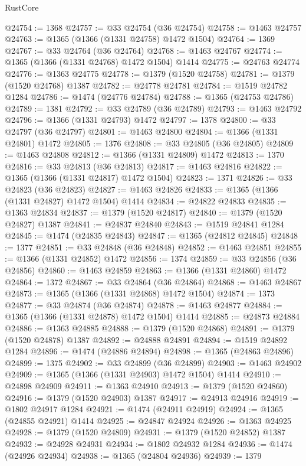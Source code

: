 \begin{lexlean}{RustCore}
\begin{coremodule}
@24754 := 1368
@24757 := @33 @24754 (@36 @24754)
@24758 := @1463 @24757
@24763 := @1365 (@1366 (@1331 @24758) @1472 @1504)
@24764 := 1369
@24767 := @33 @24764 (@36 @24764)
@24768 := @1463 @24767
@24774 := @1365 (@1366 (@1331 @24768) @1472 @1504) @1414
@24775 := @24763 @24774
@24776 := @1363 @24775
@24778 := @1379 (@1520 @24758)
@24781 := @1379 (@1520 @24768) @1387
@24782 := @24778 @24781
@24784 := @1519 @24782 @1284
@24786 := @1474 (@24776 @24784)
@24788 := @1365 (@24753 @24786)
@24789 := 1381
@24792 := @33 @24789 (@36 @24789)
@24793 := @1463 @24792
@24796 := @1366 (@1331 @24793) @1472
@24797 := 1378
@24800 := @33 @24797 (@36 @24797)
@24801 := @1463 @24800
@24804 := @1366 (@1331 @24801) @1472
@24805 := 1376
@24808 := @33 @24805 (@36 @24805)
@24809 := @1463 @24808
@24812 := @1366 (@1331 @24809) @1472
@24813 := 1370
@24816 := @33 @24813 (@36 @24813)
@24817 := @1463 @24816
@24822 := @1365 (@1366 (@1331 @24817) @1472 @1504)
@24823 := 1371
@24826 := @33 @24823 (@36 @24823)
@24827 := @1463 @24826
@24833 := @1365 (@1366 (@1331 @24827) @1472 @1504) @1414
@24834 := @24822 @24833
@24835 := @1363 @24834
@24837 := @1379 (@1520 @24817)
@24840 := @1379 (@1520 @24827) @1387
@24841 := @24837 @24840
@24843 := @1519 @24841 @1284
@24845 := @1474 (@24835 @24843)
@24847 := @1365 (@24812 @24845)
@24848 := 1377
@24851 := @33 @24848 (@36 @24848)
@24852 := @1463 @24851
@24855 := @1366 (@1331 @24852) @1472
@24856 := 1374
@24859 := @33 @24856 (@36 @24856)
@24860 := @1463 @24859
@24863 := @1366 (@1331 @24860) @1472
@24864 := 1372
@24867 := @33 @24864 (@36 @24864)
@24868 := @1463 @24867
@24873 := @1365 (@1366 (@1331 @24868) @1472 @1504)
@24874 := 1373
@24877 := @33 @24874 (@36 @24874)
@24878 := @1463 @24877
@24884 := @1365 (@1366 (@1331 @24878) @1472 @1504) @1414
@24885 := @24873 @24884
@24886 := @1363 @24885
@24888 := @1379 (@1520 @24868)
@24891 := @1379 (@1520 @24878) @1387
@24892 := @24888 @24891
@24894 := @1519 @24892 @1284
@24896 := @1474 (@24886 @24894)
@24898 := @1365 (@24863 @24896)
@24899 := 1375
@24902 := @33 @24899 (@36 @24899)
@24903 := @1463 @24902
@24909 := @1365 (@1366 (@1331 @24903) @1472 @1504) @1414
@24910 := @24898 @24909
@24911 := @1363 @24910
@24913 := @1379 (@1520 @24860)
@24916 := @1379 (@1520 @24903) @1387
@24917 := @24913 @24916
@24919 := @1802 @24917 @1284
@24921 := @1474 (@24911 @24919)
@24924 := @1365 (@24855 @24921) @1414
@24925 := @24847 @24924
@24926 := @1363 @24925
@24928 := @1379 (@1520 @24809)
@24931 := @1379 (@1520 @24852) @1387
@24932 := @24928 @24931
@24934 := @1802 @24932 @1284
@24936 := @1474 (@24926 @24934)
@24938 := @1365 (@24804 @24936)
@24939 := 1379

\end{coremodule}
\end{lexlean}
